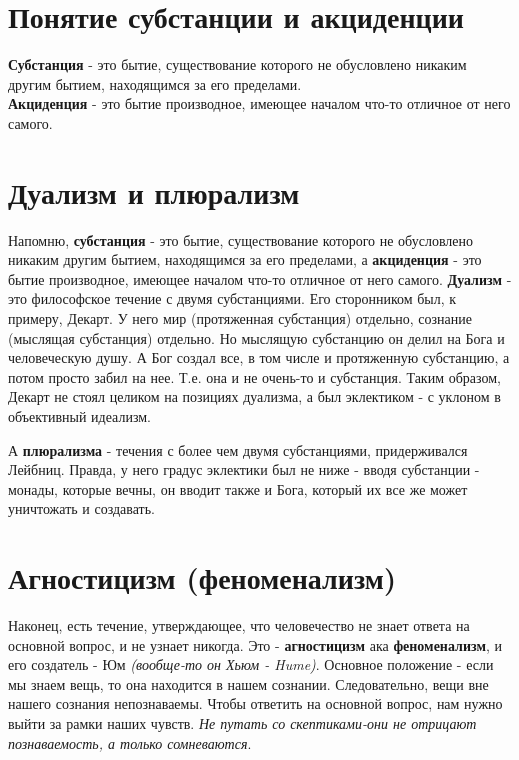 \documentclass[12pt,a4paper]{article}
\begin{document}
\section{Понятие субстанции и акциденции}
\textbf{Субстанция} - это бытие, существование которого не обусловлено никаким другим бытием,
находящимся за его пределами.\\
\textbf{Акциденция} - это бытие производное, имеющее началом
что-то отличное от него самого.

\section{Дуализм и плюрализм}
Напомню, \textbf{субстанция} - это бытие, существование которого не обусловлено никаким другим бытием,
находящимся за его пределами,
а \textbf{акциденция} - это бытие производное, имеющее началом
что-то отличное от него самого. \textbf{Дуализм} - это философское течение с двумя субстанциями. Его сторонником был, к примеру, Декарт. У него мир (протяженная субстанция) отдельно, сознание (мыслящая субстанция) отдельно. Но мыслящую субстанцию он делил на Бога и человеческую душу. А Бог создал все, в том числе и протяженную субстанцию, а потом просто забил на нее. Т.е. она и не очень-то и субстанция. Таким образом, Декарт не стоял целиком на позициях дуализма, а был эклектиком - с уклоном в объективный идеализм. 

А \textbf{плюрализма} - течения с более чем двумя субстанциями, придерживался Лейбниц. Правда, у него градус эклектики был не ниже - вводя субстанции - монады, которые вечны, он вводит также и Бога, который их все же может уничтожать и создавать. 


\section{Агностицизм (феноменализм)}
Наконец, есть течение, утверждающее, что человечество не знает ответа на основной вопрос, и не узнает никогда. Это - \textbf{агностицизм} ака \textbf{феноменализм}, и его создатель - Юм \textit{(вообще-то он Хьюм - Hume)}. Основное положение - если мы знаем вещь, то она находится в нашем сознании. Следовательно, вещи вне нашего сознания непознаваемы. Чтобы ответить на основной вопрос, нам нужно выйти за рамки наших чувств. \textit{Не путать со скептиками-они не отрицают познаваемость, а только сомневаются}.
\end{document}
